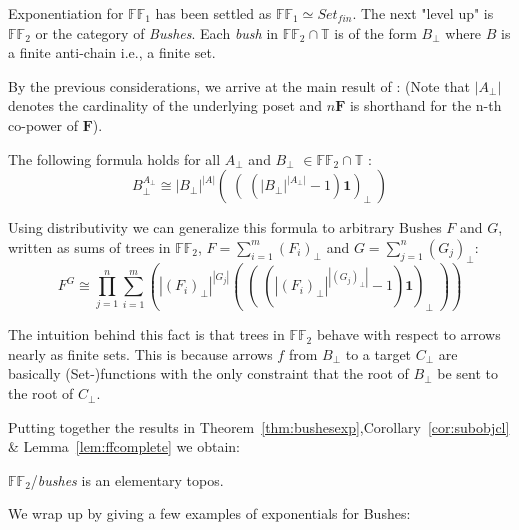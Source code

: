 \newpage

Exponentiation for $\mathbb{FF}_1$ has been settled as $\mathbb{FF}_1 \simeq Set_{fin}$. \newline
The next "level up" is $\mathbb{FF}_2$ or the category of \emph{Bushes}. \newline
Each \emph{bush} in $\mathbb{FF}_2 \cap \mathbb{T}$ is of the form $B_\bot$ where $B$ is a finite anti-chain i.e., a finite set. \newline

By the previous considerations, we arrive at the main result of \cite{towards}: \newline
(Note that $ |A_\bot|$ denotes the cardinality of the underlying poset and $n\textbf{F}$ is shorthand for the n-th co-power of $\textbf{F}$).
\begin{thm}\label{thm:bushesexp}
 The following formula holds for all $A_\bot$ and $B_\bot$ $\in \mathbb{FF}_2 \cap \mathbb{T}$ :
\begin{equation}\label{exponent}
	B_\bot ^{A_\bot} \cong | B_\bot |^{|A|} (\;(\; (|B_\bot|^{|A_\bot|} -1)\mathbf{1} )_\bot\;)
\end{equation}

Using distributivity we can generalize this formula to arbitrary Bushes $F$ and $G$, written as sums of trees in $\mathbb{FF}_2$, $F=\sum_{i=1}^{m}(F_i)_\bot$ and $G=\sum_{j=1}^{n}(G_j)_\bot$:
\begin{equation}
	F ^ G \cong \prod_{j=1}^{n} \sum_{i=1}^{m} ( | (F_i)_\bot |^{|G_j|} (\;(\; (|(F_i)_\bot|^{|(G_j)_\bot|} -1)\mathbf{1} )_\bot\;) )
\end{equation}
\end{thm} 

 The intuition behind this fact is that trees in $\mathbb{FF}_2$ behave with respect to arrows nearly as finite sets. This is because arrows $f$ from $B_\bot$ to a target $C_\bot$ are  basically (Set-)functions with the only constraint that the root of $B_\bot$  be sent to the root of $C_\bot$.\newline
 
 Putting together the results in Theorem~\ref{thm:bushesexp},Corollary~\ref{cor:subobjcl} \& Lemma~\ref{lem:ffcomplete} we obtain:
 \begin{cor}
 	$\mathbb{FF}_2$/\emph{bushes} is an elementary topos.
 \end{cor}
 
 	We wrap up by giving a few examples of exponentials for Bushes:
 
